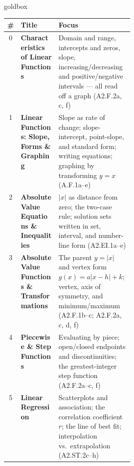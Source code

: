 \documentclass[10pt]{article}
\begin{document}
\renewcommand{\arraystretch}{1.5}
\begin{skillbox}{goldbox}
\begin{tabularx}{\linewidth}{@{} c >{\bfseries}p{0.30\linewidth} X @{}}
  \textbf{\#} & \textbf{Title} & \textbf{Focus} \\
  \hline
  0 & Characteristics of Linear Functions
    & Domain and range, intercepts and zeros, slope, increasing/decreasing and
      positive/negative intervals --- all read off a graph (A2.F.2a, c, f) \\
  \hline
  1 & Linear Functions: Slope, Forms \& Graphing
    & Slope as rate of change; slope-intercept, point-slope, and standard form;
      writing equations; graphing by transforming $y=x$ (A.F.1a--e) \\
  \hline
  2 & Absolute Value Equations \& Inequalities
    & $|x|$ as distance from zero; the two-case rule; solution sets written in set,
      interval, and number-line form (A2.EI.1a--e) \\
  \hline
  3 & Absolute Value Functions \& Transformations
    & The parent $y=|x|$ and vertex form $g(x)=a|x-h|+k$; vertex, axis of symmetry,
      and minimum/maximum (A2.F.1b--c; A2.F.2a, c, d, f) \\
  \hline
  4 & Piecewise \& Step Functions
    & Evaluating by piece; open/closed endpoints and discontinuities; the
      greatest-integer step function (A2.F.2a--c, f) \\
  \hline
  5 & Linear Regression
    & Scatterplots and association; the correlation coefficient $r$; the line of best
      fit; interpolation vs.\ extrapolation (A2.ST.2c--h) \\
  \hline
\end{tabularx}
\end{skillbox}

\vspace{0.14in}
\end{document}
